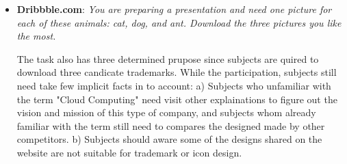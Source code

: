 \begin{itemize}
    \item \textbf{Dribbble.com}: \emph{You are preparing a presentation and need one picture for each of these animals: 
    cat, dog, and ant. Download the three pictures you like the most.}

        The task also has three determined prupose since subjects are quired to download three candicate trademarks.
        While the participation, subjects still need take few implicit facts in to account:
        a) Subjects who unfamiliar with the term "Cloud Computing" need visit other explainations to figure out
        the vision and mission of this type of company, and subjects whom already familiar with the term
        still need to compares the designed made by other competitors.
        b) Subjects should aware some of the designs shared on the website are not suitable for trademark or icon design.
\end{itemize}

\cleardoublepage